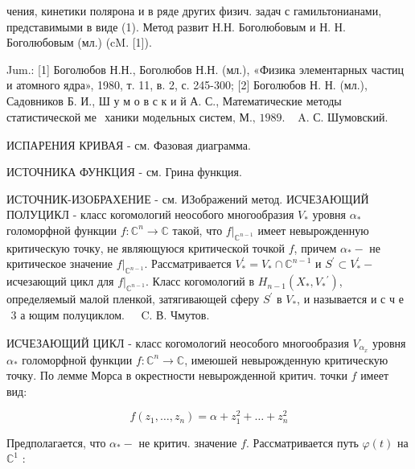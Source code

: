 \documentclass[10pt]{article}
\begin{document}
чения, кинетики полярона и в ряде других физич. задач с гамильтонианами, представимыми в виде (1). Метод развит Н.Н. Боголюбовым и Н. Н. Боголюбовым (мл.) (cM. [1]).



Jum.: [1] Боголюбов Н.Н., Боголюбов Н.Н. (мл.), «Физика элементарных частиц и атомного ядра», 1980, т. 11, в. 2, с. 245-300; [2] Боголюбов Н. Н. (мл.), Садовников Б. И., Ш у м о в с к и й А. С., Математические методы статистической ме$\begin{array}{ll}\text { ханики модельных систем, М., } 1989 . & \text { A. С. Шумовский. }\end{array}$



ИСПАРЕНИЯ КРИВАЯ - см. Фазовая диаграмма.



ИСТОЧНИКА ФУНКЦИЯ - см. Грина функция.



ИСТОЧНИК-ИЗОБРАХЕНИЕ - см. ИЗображений метод. ИСЧЕЗАЮЩИЙ ПОЛУЦИКЛ - класс когомологий неособого многообразия $V_{*}$ уровня $\alpha_{*}$ голоморфной функции $f: \mathbb{C}^{n} \rightarrow \mathbb{C}$ такой, что $\left.f\right|_{\mathbb{C}^{n-1}}$ имеет невырожденную критическую точку, не являющуюся критической точкой $f$, причем $\alpha_{*}-$ не критическое значение $\left.f\right|_{\mathbb{C}^{n-1}}$. Рассматривается $V_{*}^{\prime}=V_{*} \cap \mathbb{C}^{n-1}$ и $S^{\prime} \subset V_{*}^{\prime}-$ исчезающий цикл для $\left.f\right|_{\mathbb{C}^{n-1}}$. Класс когомологий в $H_{n-1}\left(X_{*}, V_{*}{ }^{\prime}\right)$, определяемый малой пленкой, затягивающей сферу $S^{\prime}$ в $V_{*}$, и называется и с ч е $\begin{array}{ll}3 \text { а ющим полуциклом. } & \text { C. В. Чмутов. }\end{array}$



ИСЧЕЗАЮЩИЙ ЦИКЛ - класс когомологий неособого многообразия $V_{\alpha_{x}}$ уровня $\alpha_{*}$ голоморфной функции $f: \mathbb{C}^{n} \rightarrow \mathbb{C}$, имеюшей невырожденную критическую точку. По лемме Морса в окрестности невырожденной критич. точки $f$ имеет вид:



\[

f\left(z_{1}, \ldots, z_{n}\right)=\alpha+z_{1}^{2}+\ldots+z_{n}^{2}

\]



Предполагается, что $\alpha_{*}-$ не критич. значение $f$. Рассматривается путь $\varphi(t)$ на $\mathbb{C}^{1}$ :
\end{document}
